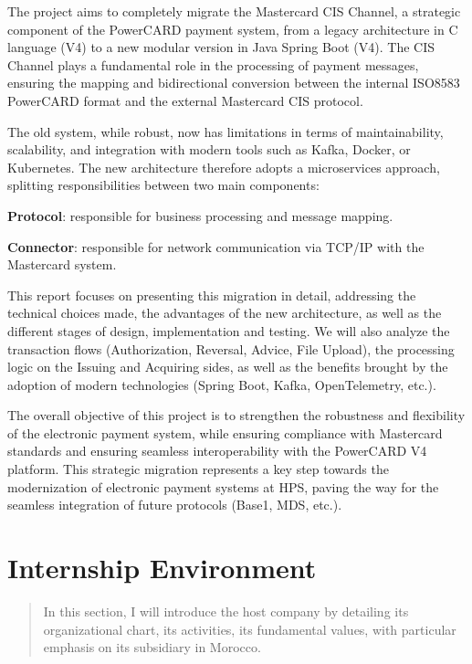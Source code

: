 \documentclass[12pt,a4paper]{report}
\begin{document}
The project aims to completely migrate the Mastercard CIS Channel, a
strategic component of the PowerCARD payment system, from a legacy
architecture in C language (V4) to a new modular version in Java Spring
Boot (V4). The CIS Channel plays a fundamental role in the processing of
payment messages, ensuring the mapping and bidirectional conversion
between the internal ISO8583 PowerCARD format and the external
Mastercard CIS protocol.

The old system, while robust, now has limitations in terms of
maintainability, scalability, and integration with modern tools such as
Kafka, Docker, or Kubernetes. The new architecture therefore adopts a
microservices approach, splitting responsibilities between two main
components:

\textbf{Protocol}: responsible for business processing and message
mapping.

\textbf{Connector}: responsible for network communication via TCP/IP
with the Mastercard system.

This report focuses on presenting this migration in detail, addressing
the technical choices made, the advantages of the new architecture, as
well as the different stages of design, implementation and testing. We
will also analyze the transaction flows (Authorization, Reversal,
Advice, File Upload), the processing logic on the Issuing and Acquiring
sides, as well as the benefits brought by the adoption of modern
technologies (Spring Boot, Kafka, OpenTelemetry, etc.).

The overall objective of this project is to strengthen the robustness
and flexibility of the electronic payment system, while ensuring
compliance with Mastercard standards and ensuring seamless
interoperability with the PowerCARD V4 platform. This strategic
migration represents a key step towards the modernization of electronic
payment systems at HPS, paving the way for the seamless integration of
future protocols (Base1, MDS, etc.).


\clearpage

\chapter{Internship Environment}

\begin{quote}
In this section, I will introduce the host company by detailing its
organizational chart, its activities, its fundamental values, with
particular emphasis on its subsidiary in Morocco.
\end{quote}
\end{document}
